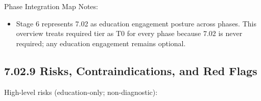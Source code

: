 \documentclass[10pt]{article}
\begin{document}
\endgroup

Phase Integration Map Notes:

\begin{itemize}
\item Stage 6 represents 7.02 as education engagement posture across phases. This overview treats required tier as T0 for every phase because 7.02 is never required; any education engagement remains optional.
\end{itemize}

\subsection*{7.02.9 Risks, Contraindications, and Red Flags}
{}

High-level risks (education-only; non-diagnostic):
\end{document}
